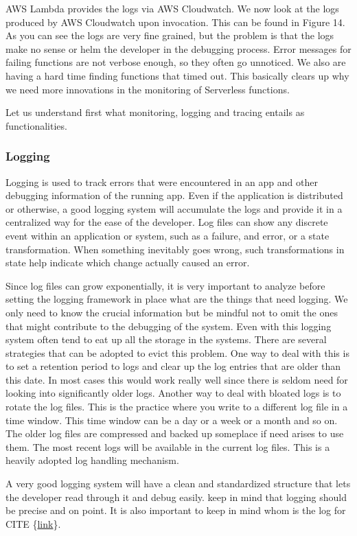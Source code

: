 \documentclass[12pt,titlepage]{article}
\begin{document}
AWS Lambda provides the logs via AWS Cloudwatch. We now look at the logs
produced by AWS Cloudwatch upon invocation. This can be found in Figure 14. As
you can see the logs are very fine grained, but the problem is that the logs
make no sense or helm the developer in the debugging process. Error messages for
failing functions are not verbose enough, so they often go unnoticed. We also are
having a hard time finding functions that timed out. This basically clears up
why we need more innovations in the monitoring of Serverless functions.

Let us understand first what monitoring, logging and tracing entails as functionalities. 
\subsubsection{Logging}
\label{sec:orgdfff98a}
Logging is used to track errors that were encountered in an app and other
debugging information of the running app. Even if the application is distributed
or otherwise, a good logging system will accumulate the logs and provide it in a
centralized way for the ease of the developer. Log files can show any discrete
event within an application or system, such as a failure, and error, or a state
transformation. When something inevitably goes wrong, such transformations in
state help indicate which change actually caused an error.

Since log files can grow exponentially, it is very important to analyze before
setting the logging framework in place what are the things that need logging. We
only need to know the crucial information but be mindful not to omit the ones
that might contribute to the debugging of the system. Even with this logging
system often tend to eat up all the storage in the systems. There are several
strategies that can be adopted to evict this problem. One way to deal with this
is to set a retention period to logs and clear up the log entries that are older
than this date. In most cases this would work really well since there is seldom
need for looking into significantly older logs. Another way to deal with bloated
logs is to rotate the log files. This is the practice where you write to a
different log file in a time window. This time window can be a day or a week or
a month and so on. The older log files are compressed and backed up someplace if
need arises to use them. The most recent logs will be available in the current
log files. This is a heavily adopted log handling mechanism.

A very good logging system will have a clean and standardized structure that
lets the developer read through it and debug easily. keep in mind that logging
should be precise and on point. It is also important to keep in mind whom is the
log for CITE \{\href{https://www.bmc.com/blogs/monitoring-logging-tracing/}{link}\}. 
\end{document}

